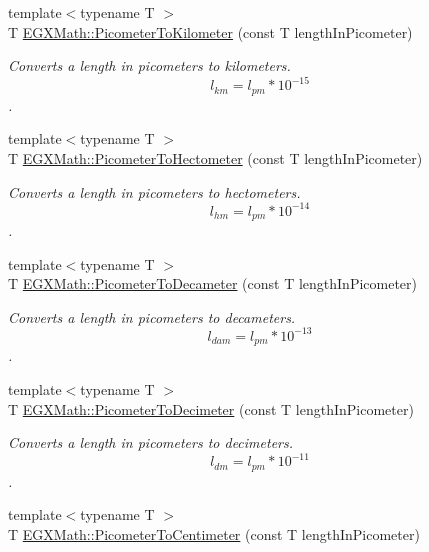 \begin{DoxyCompactItemize}
{\footnotesize template$<$typename T $>$ }\\T \mbox{\hyperlink{group___e_g_x_math-_conversions-_length_conversions-_s_i-_picometer-_s_i_ga8a1f5000b027dfc9980738a0565c773e}{E\+G\+X\+Math\+::\+Picometer\+To\+Kilometer}} (const T length\+In\+Picometer)
\begin{DoxyCompactList}\small\item\em Converts a length in picometers to kilometers. \[ l_{km}=l_{pm} * 10^{-15} \]. \end{DoxyCompactList}\item 
{\footnotesize template$<$typename T $>$ }\\T \mbox{\hyperlink{group___e_g_x_math-_conversions-_length_conversions-_s_i-_picometer-_s_i_ga51eebefd8810385585aa33ca80ac6e93}{E\+G\+X\+Math\+::\+Picometer\+To\+Hectometer}} (const T length\+In\+Picometer)
\begin{DoxyCompactList}\small\item\em Converts a length in picometers to hectometers. \[ l_{hm}=l_{pm} * 10^{-14} \]. \end{DoxyCompactList}\item 
{\footnotesize template$<$typename T $>$ }\\T \mbox{\hyperlink{group___e_g_x_math-_conversions-_length_conversions-_s_i-_picometer-_s_i_gac3123f93cc73d11cefa26073dc2c46a5}{E\+G\+X\+Math\+::\+Picometer\+To\+Decameter}} (const T length\+In\+Picometer)
\begin{DoxyCompactList}\small\item\em Converts a length in picometers to decameters. \[ l_{dam}=l_{pm} * 10^{-13} \]. \end{DoxyCompactList}\item 
{\footnotesize template$<$typename T $>$ }\\T \mbox{\hyperlink{group___e_g_x_math-_conversions-_length_conversions-_s_i-_picometer-_s_i_gab0d70362fb21996562efb9c22d9bacf4}{E\+G\+X\+Math\+::\+Picometer\+To\+Decimeter}} (const T length\+In\+Picometer)
\begin{DoxyCompactList}\small\item\em Converts a length in picometers to decimeters. \[ l_{dm}=l_{pm} * 10^{-11} \]. \end{DoxyCompactList}\item 
{\footnotesize template$<$typename T $>$ }\\T \mbox{\hyperlink{group___e_g_x_math-_conversions-_length_conversions-_s_i-_picometer-_s_i_gabb7609315d88da8dd25575caf15a5e06}{E\+G\+X\+Math\+::\+Picometer\+To\+Centimeter}} (const T length\+In\+Picometer)

\end{DoxyCompactItemize}
